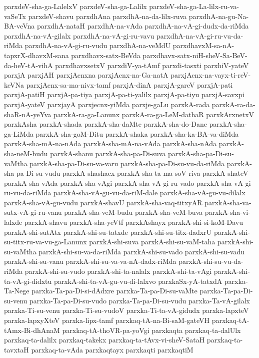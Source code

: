 {parxdeV-sha-ga-LalelxV
parxdeV-sha-ga-Lalilx
parxdeV-sha-ga-La-lilx-ru-va-vaSeTx
parxdeV-shavu
parxdhAna
parxdhA-na-da-lilx-ruva
parxdhA-na-gu-Na-BA-veVna
parxdhA-nataH
parxdhA-na-vAda
parxdhA-na-vA-gi-dudx-da-riMda
parxdhA-na-vA-gilalx
parxdhA-na-vA-gi-ru-vavu
parxdhA-na-vA-gi-ru-vu-da-riMda
parxdhA-na-vA-gi-ru-vudu
parxdhA-na-veMdU
parxdhavxM-sa-nA-tapxrX-dhavxM-sana
parxdhavx-satx-BeVda
parxdhavx-satx-niH-sheV-Sa-BeV-da-heV-tA-vihA
parxdhavxsetxV
parxdiV-ya-tAmf
parxdi-tasxti
parxhiV-yateV
parxjA
parxjAH
parxjAcnxna
parxjAcnx-na-Ga-natA
parxjAcnx-na-vayx-ti-reV-keVNa
parxjAcnx-sa-ma-nivx-tamf
parxjA-dinA
parxjA-gareV
parxjA-pati
parxjA-patiH
parxjA-pa-tiya
parxjA-pa-ti-yalilx
parxjA-pa-tiyu
parxjA-savxpi
parxjA-yateV
parxjayA
parxjecnx-yiMda
parxje-gaLu
parxkA-rada
parxkA-ra-da-shaR-nA-yeYva
parxkA-ra-ga-Lanunx
parxkA-ra-ga-LeM-dathaR
parxkArxnetxV
parxkAsha
parxkA-shada
parxkA-sha-daMte
parxkA-sha-do-Dane
parxkA-sha-ga-LiMda
parxkA-sha-goM-Ditu
parxkA-shaka
parxkA-sha-ka-BA-va-diMda
parxkA-sha-mA-na-nAda
parxkA-sha-mA-na-vAda
parxkA-sha-nAda
parxkA-sha-neM-budu
parxkA-shanu
parxkA-sha-pa-Di-suva
parxkA-sha-pa-Di-su-vaMtha
parxkA-sha-pa-Di-su-va-varu
parxkA-sha-pa-Di-su-vu-da-riMda
parxkA-sha-pa-Di-su-vudu
parxkA-shashacx
parxkA-sha-ta-ma-soV-riva
parxkA-shateV
parxkA-sha-vAda
parxkA-sha-vAgi
parxkA-sha-vA-gi-ru-vado
parxkA-sha-vA-gi-ru-vu-da-riMda
parxkA-sha-vA-gu-vu-da-riM-dale
parxkA-sha-vA-gu-vu-dilalx
parxkA-sha-vA-gu-vudu
parxkA-shavU
parxkA-sha-vaq-titxyAR
parxkA-sha-va-sutx-vA-gi-ru-vanu
parxkA-sha-veM-budu
parxkA-sha-veM-buva
parxkA-sha-vi-lalxde
parxkA-shavu
parxkA-sha-yeVtf
parxkAshayx
parxkA-shi-si-koM-Davu
parxkA-shi-sutAtx
parxkA-shi-su-tatxde
parxkA-shi-su-titx-dadxrU
parxkA-shi-su-titx-ru-va-vu-ga-Lanunx
parxkA-shi-suva
parxkA-shi-su-vaM-taha
parxkA-shi-su-vaMtha
parxkA-shi-su-va-da-riMda
parxkA-shi-su-vado
parxkA-shi-su-vadu
parxkA-shi-su-vanu
parxkA-shi-su-va-va-nA-dadx-riMda
parxkA-shi-su-vu-da-riMda
parxkA-shi-su-vudo
parxkA-shi-ta-nalalx
parxkA-shi-ta-vAgi
parxkA-shi-ta-vA-gi-didxtu
parxkA-shi-ta-vA-gu-vu-di-lalxvo
parxkaSx-yA-tatxdA
parxka-Ta-Nege
parxka-Ta-pa-Di-si-dAdxre
parxka-Ta-pa-Di-su-vaMte
parxka-Ta-pa-Di-su-venu
parxka-Ta-pa-Di-su-vudo
parxka-Ta-pa-Di-su-vudu
parxka-Ta-vA-gilalx
parxka-Ti-su-venu
parxka-Ti-su-vudoV
parxka-Ti-ta-vA-gidudx
parxka-lapxteV
parxka-lapxyXteV
parxka-lipx-tamf
parxkaq-tA-na-Bi-saM-gateVH
parxkaq-tA-tAmx-Bi-dhAnaM
parxkaq-tA-thoVR-pa-yoVgi
parxkaqta
parxkaq-ta-dalUlx
parxkaq-ta-dalilx
parxkaq-takekx
parxkaq-ta-tAvx-vi-sheV-SataH
parxkaq-ta-tavxtaH
parxkaq-ta-vAda
parxkaqtayx
parxkaqti
parxkaqtiM
}
